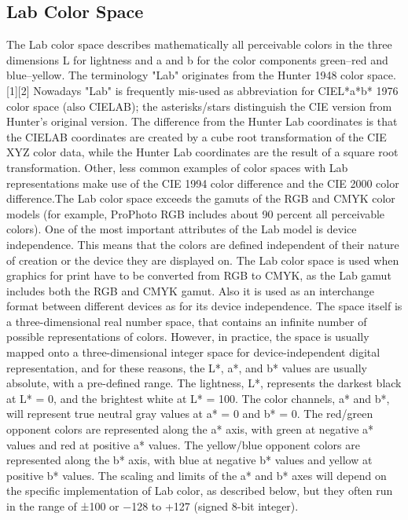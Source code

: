 \subsection{Lab Color Space}
The Lab color space describes mathematically all perceivable colors in the three dimensions L for lightness and a and b for the color components green–red and blue–yellow. The terminology "Lab" originates from the Hunter 1948 color space.[1][2] Nowadays "Lab" is frequently mis-used as abbreviation for CIEL*a*b* 1976 color space (also CIELAB); the asterisks/stars distinguish the CIE version from Hunter's original version. The difference from the Hunter Lab coordinates is that the CIELAB coordinates are created by a cube root transformation of the CIE XYZ color data, while the Hunter Lab coordinates are the result of a square root transformation. Other, less common examples of color spaces with Lab representations make use of the CIE 1994 color difference and the CIE 2000 color difference.The Lab color space exceeds the gamuts of the RGB and CMYK color models (for example, ProPhoto RGB includes about 90 percent all perceivable colors). One of the most important attributes of the Lab model is device independence. This means that the colors are defined independent of their nature of creation or the device they are displayed on. The Lab color space is used when graphics for print have to be converted from RGB to CMYK, as the Lab gamut includes both the RGB and CMYK gamut. Also it is used as an interchange format between different devices as for its device independence. The space itself is a three-dimensional real number space, that contains an infinite number of possible representations of colors. However, in practice, the space is usually mapped onto a three-dimensional integer space for device-independent digital representation, and for these reasons, the L*, a*, and b* values are usually absolute, with a pre-defined range. The lightness, L*, represents the darkest black at L* = 0, and the brightest white at L* = 100. The color channels, a* and b*, will represent true neutral gray values at a* = 0 and b* = 0. The red/green opponent colors are represented along the a* axis, with green at negative a* values and red at positive a* values. The yellow/blue opponent colors are represented along the b* axis, with blue at negative b* values and yellow at positive b* values. The scaling and limits of the a* and b* axes will depend on the specific implementation of Lab color, as described below, but they often run in the range of ±100 or −128 to +127 (signed 8-bit integer).

